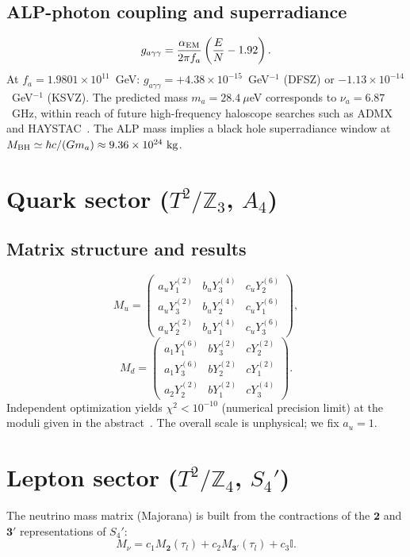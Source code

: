 \documentclass[12pt,a4paper]{article}
\numberwithin{equation}{section}
\begin{document}
\subsection{ALP-photon coupling and superradiance}
\begin{equation}
g_{a\gamma\gamma} = \frac{\alpha_{\rm EM}}{2\pi f_a}\left(\frac{E}{N} - 1.92\right).
\end{equation}
At \(f_a = 1.9801\times10^{11}\)~GeV: \(g_{a\gamma\gamma} = +4.38\times10^{-15}\)~GeV\(^{-1}\) (DFSZ) or \(-1.13\times10^{-14}\)~GeV\(^{-1}\) (KSVZ). The predicted mass \(m_a = 28.4~\mu\)eV corresponds to \(\nu_a = 6.87\)~GHz, within reach of future high-frequency haloscope searches such as ADMX~\cite{ADMX2018} and HAYSTAC~\cite{HAYSTAC2021}. The ALP mass implies a black hole superradiance window at \(M_{\rm BH} \simeq \hbar c / (G m_a) \approx 9.36 \times 10^{24}~{\rm kg}\).

\section{Quark sector (\(T^2/\mathbb{Z}_3\), \(A_4\))}
\subsection{Matrix structure and results}
\begin{equation}
M_u = \begin{pmatrix}
a_u Y_1^{(2)} & b_u Y_3^{(4)} & c_u Y_2^{(6)} \\
a_u Y_3^{(2)} & b_u Y_2^{(4)} & c_u Y_1^{(6)} \\
a_u Y_2^{(2)} & b_u Y_1^{(4)} & c_u Y_3^{(6)}
\end{pmatrix},
\end{equation}
\begin{equation}
M_d = \begin{pmatrix}
a_1 Y_1^{(6)} & b Y_3^{(2)} & c Y_2^{(2)} \\
a_1 Y_3^{(6)} & b Y_2^{(2)} & c Y_1^{(2)} \\
a_2 Y_2^{(2)} & b Y_1^{(2)} & c Y_3^{(4)}
\end{pmatrix}.
\end{equation}
Independent optimization yields \(\chi^2 < 10^{-10}\) (numerical precision limit) at the moduli given in the abstract~\cite{PDG2024}. The overall scale is unphysical; we fix \(a_u = 1\).

\section{Lepton sector (\(T^2/\mathbb{Z}_4\), \(S_4'\))}
\label{sec:lepton}
The neutrino mass matrix (Majorana) is built from the contractions of the \(\mathbf{2}\) and \(\mathbf{3}'\) representations of \(S_4'\):
\begin{equation}
M_\nu = c_1 M_{\mathbf{2}}(\tau_l) + c_2 M_{\mathbf{3}'}(\tau_l) + c_3 \mathbb{I}.
\end{equation}
\end{document}
